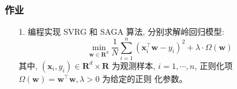 \documentclass[handout]{beamer}
\begin{document}
\begin{frame}[fragile]
\frametitle{作业 }
\begin{itemize}

  \item[1.]编程实现 SVRG 和 SAGA 算法, 分别求解岭回归模型:
$$
\min _{\boldsymbol{w} \in \mathbf{R}^{\mathrm{d}}} \frac{1}{N} \sum_{i=1}^n\left(\boldsymbol{x}_i^{\top} \boldsymbol{w}-y_i\right)^2+\lambda \cdot \Omega(\boldsymbol{w})
$$
其中, $\left(\boldsymbol{x}_i, y_i\right) \in \mathbf{R}^d \times \mathbf{R}$ 为观测样本, $i=1, \cdots, n$, 正则化项 $\Omega(\boldsymbol{w})=\boldsymbol{w}^{\top} \boldsymbol{w}, \lambda>0$ 为给定的正则 化参数。

\end{itemize}
\end{frame}
\end{document}
